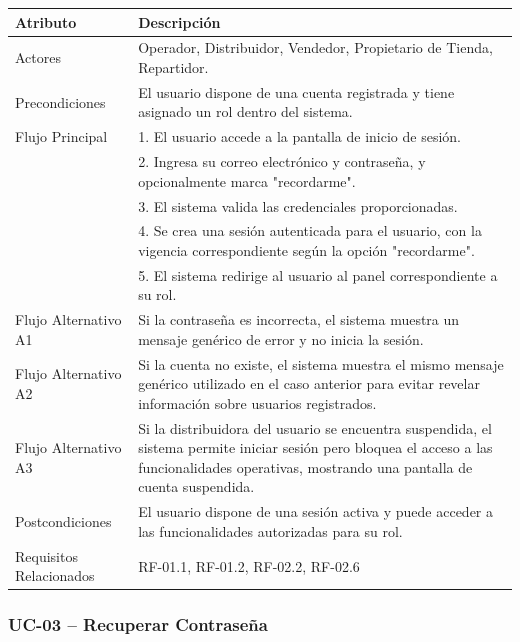 \documentclass[12pt,a4paper]{report}
\begin{document}
\begin{longtable}{|p{4cm}|p{10cm}|}
\hline
\textbf{Atributo} & \textbf{Descripción} \\ \hline
Actores & Operador, Distribuidor, Vendedor, Propietario de Tienda, Repartidor. \\ \hline
Precondiciones & El usuario dispone de una cuenta registrada y tiene asignado un rol dentro del sistema. \\ \hline
Flujo Principal &
1. El usuario accede a la pantalla de inicio de sesión.\\
& 2. Ingresa su correo electrónico y contraseña, y opcionalmente marca "recordarme".\\
& 3. El sistema valida las credenciales proporcionadas.\\
& 4. Se crea una sesión autenticada para el usuario, con la vigencia correspondiente según la opción "recordarme".\\
& 5. El sistema redirige al usuario al panel correspondiente a su rol. \\ \hline
Flujo Alternativo A1 & Si la contraseña es incorrecta, el sistema muestra un mensaje genérico de error y no inicia la sesión. \\ \hline
Flujo Alternativo A2 & Si la cuenta no existe, el sistema muestra el mismo mensaje genérico utilizado en el caso anterior para evitar revelar información sobre usuarios registrados. \\ \hline
Flujo Alternativo A3 & Si la distribuidora del usuario se encuentra suspendida, el sistema permite iniciar sesión pero bloquea el acceso a las funcionalidades operativas, mostrando una pantalla de cuenta suspendida. \\ \hline
Postcondiciones & El usuario dispone de una sesión activa y puede acceder a las funcionalidades autorizadas para su rol. \\ \hline
Requisitos Relacionados & RF-01.1, RF-01.2, RF-02.2, RF-02.6 \\ \hline
\end{longtable}
\subsubsection{UC-03 -- Recuperar Contraseña}
\end{document}
